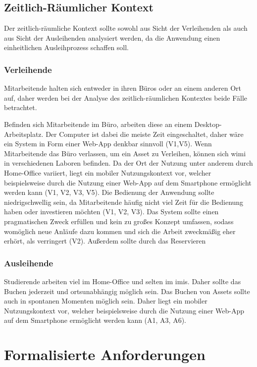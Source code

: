 \subsection{Zeitlich-Räumlicher Kontext}
\label{section:zeit}
Der zeitlich-räumliche Kontext sollte sowohl aus Sicht der Verleihenden als auch aus Sicht der
Ausleihenden analysiert werden, da die Anwendung einen einheitlichen Ausleihprozess schaffen soll.

\subsubsection{Verleihende}
Mitarbeitende halten sich entweder in ihren Büros oder an einem anderen Ort auf, daher werden bei
der Analyse des zeitlich-räumlichen Kontextes beide Fälle betrachtet.

Befinden sich Mitarbeitende im Büro, arbeiten diese an einem Desktop-Arbeitsplatz. Der Computer ist
dabei die meiste Zeit eingeschaltet, daher wäre ein System in Form einer Web-App denkbar sinnvoll
(V1,V5). Wenn Mitarbeitende das Büro verlassen, um ein Asset zu Verleihen, können sich \ac{wimi} in
verschiedenen Laboren befinden. Da der Ort der Nutzung unter anderem durch Home-Office variiert,
liegt ein mobiler Nutzungskontext vor, welcher beispielsweise durch die Nutzung einer Web-App auf
dem Smartphone ermöglicht werden kann (V1, V2, V3, V5). Die Bedienung der Anwendung sollte
niedrigschwellig sein, da Mitarbeitende häufig nicht viel Zeit für die Bedienung haben oder
investieren möchten (V1, V2, V3). Das System sollte einen pragmatischen Zweck erfüllen und kein zu
großes Konzept umfassen, sodass womöglich neue Anläufe dazu kommen und sich die Arbeit zweckmäßig
eher erhört, als verringert (V2). Außerdem sollte durch das Reservieren

\subsubsection{Ausleihende}
Studierende arbeiten viel im Home-Office und selten im \ac{imis}. Daher sollte das Buchen jederzeit
und ortsunabhängig möglich sein. Das Buchen von Assets sollte auch in spontanen Momenten möglich
sein. Daher liegt ein mobiler Nutzungskontext vor, welcher beispielsweise durch die Nutzung einer
Web-App auf dem Smartphone ermöglicht werden kann (A1, A3, A6).


\section{Formalisierte Anforderungen}
\label{section:anforderung}

